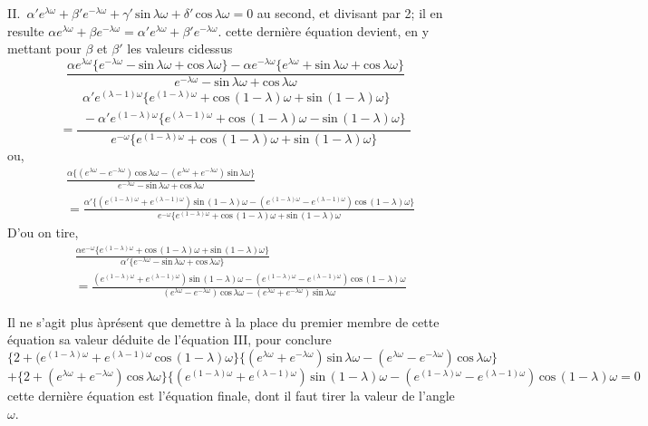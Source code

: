 \documentclass[11pt,a4paper]{article}
\begin{document}
II.~$\alpha' e^{\lambda\omega} + \beta' e^{-\lambda\omega} + \gamma'\,\text{sin}\,\lambda\omega + \delta'\,\text{cos}\,\lambda\omega = 0$ au second, et divisant par 2; il en resulte
$\alpha e^{\lambda\omega} + \beta e^{-\lambda\omega} = \alpha' e^{\lambda\omega} + \beta' e^{-\lambda\omega}$. cette dernière équation devient, en y mettant pour
$\beta$ et $\beta'$ les valeurs cidessus
\[ \frac{\alpha e^{\lambda\omega}\{e^{-\lambda\omega} - \text{sin}\,\lambda\omega + \text{cos}\,\lambda\omega\} - \alpha e^{-\lambda\omega}\{e^{\lambda\omega} + \text{sin}\,\lambda\omega + \text{cos}\,\lambda\omega\}}{e^{-\lambda\omega} - \text{sin}\,\lambda\omega + \text{cos}\,\lambda\omega} \]
\[ = \frac{\begin{array}{c}\alpha' e^{(\lambda-1)\omega}\{e^{(1-\lambda)\omega} + \text{cos}\,(1-\lambda)\omega + \text{sin}\,(1-\lambda)\omega\} \\ {} - \alpha' e^{(1-\lambda)\omega}\{e^{(\lambda-1)\omega} + \text{cos}\,(1-\lambda)\omega - \text{sin}\,(1-\lambda)\omega\}\end{array}}{e^{-\omega}\{e^{(1-\lambda)\omega} + \text{cos}\,(1-\lambda)\omega + \text{sin}\,(1-\lambda)\omega\}} \]
ou,
\begin{align*}
&\frac{\alpha\{(e^{\lambda\omega} - e^{-\lambda\omega})\,\text{cos}\,\lambda\omega - (e^{\lambda\omega} + e^{-\lambda\omega})\,\text{sin}\,\lambda\omega\}}{e^{-\lambda\omega} - \text{sin}\,\lambda\omega + \text{cos}\,\lambda\omega} \\
&= \frac{\alpha'\{(e^{(1-\lambda)\omega} + e^{(\lambda-1)\omega})\,\text{sin}\,(1-\lambda)\omega - (e^{(1-\lambda)\omega} - e^{(\lambda-1)\omega})\,\text{cos}\,(1-\lambda)\omega\}}{e^{-\omega}\{e^{(1-\lambda)\omega} + \text{cos}\,(1-\lambda)\omega + \text{sin}\,(1-\lambda)\omega}
\end{align*}
D'ou on tire,
\begin{align*}
&\frac{\alpha e^{-\omega}\{e^{(1-\lambda)\omega} + \text{cos}\,(1-\lambda)\omega + \text{sin}\,(1-\lambda)\omega\}}{\alpha'\{e^{-\lambda\omega} - \text{sin}\,\lambda\omega + \text{cos}\,\lambda\omega\}} \\
&= \frac{(e^{(1-\lambda)\omega} + e^{(\lambda-1)\omega})\,\text{sin}\,(1-\lambda)\omega - (e^{(1-\lambda)\omega} - e^{(\lambda-1)\omega})\,\text{cos}\,(1-\lambda)\omega}{(e^{\lambda\omega} - e^{-\lambda\omega})\,\text{cos}\,\lambda\omega - (e^{\lambda\omega} + e^{-\lambda\omega})\,\text{sin}\,\lambda\omega}
\end{align*}

Il ne s'agit plus àprésent que demettre à la place du premier membre de cette équation
sa valeur déduite de l'équation III, pour conclure
\[ \{2 + (e^{(1-\lambda)\omega} + e^{(\lambda-1)\omega}\,\text{cos}\,(1-\lambda)\omega\}\{(e^{\lambda\omega} + e^{-\lambda\omega})\,\text{sin}\,\lambda\omega - (e^{\lambda\omega} - e^{-\lambda\omega})\,\text{cos}\,\lambda\omega\} \]
\[ + \{2 + (e^{\lambda\omega} + e^{-\lambda\omega})\,\text{cos}\,\lambda\omega\}\{(e^{(1-\lambda)\omega} + e^{(\lambda-1)\omega})\,\text{sin}\,(1-\lambda)\omega - (e^{(1-\lambda)\omega} - e^{(\lambda-1)\omega})\,\text{cos}\,(1-\lambda)\omega = 0 \]
cette dernière équation est l'équation finale, dont il faut tirer la valeur
de l'angle $\omega$.
\end{document}
